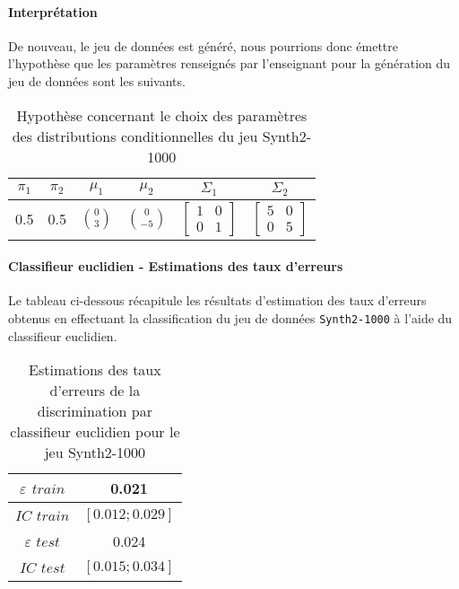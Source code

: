 \documentclass{report}
\begin{document}
\paragraph{Interprétation}
De nouveau, le jeu de données est généré, nous pourrions donc émettre l'hypothèse que les paramètres renseignés par l'enseignant pour la génération du jeu de données sont les suivants.

\begin{table}[h!]
    \centering
    \caption{Hypothèse concernant le choix des paramètres des distributions conditionnelles du jeu Synth2-1000}
    \label{tab:table1}
    \def\arraystretch{1.5}
    \begin{tabular}{c|c|c|c|c|c}
        $\pi_1$ & $\pi_2$ & $\mu_1$ & $\mu_2$ & $\Sigma_1$ & $\Sigma_2$\\
        \hline
        0.5 & 0.5 & $\binom{0}{3}$ & $\binom{0}{-5}$
        & $\begin{bmatrix} 1 & 0\\ 0 & 1 \end{bmatrix}$
        & $\begin{bmatrix} 5 & 0\\ 0 & 5 \end{bmatrix}$
        \\
    \end{tabular}
\end{table}

\newpage
\paragraph{Classifieur euclidien - Estimations des taux d'erreurs}
Le tableau ci-dessous récapitule les résultats d'estimation des taux d'erreurs obtenus en effectuant la classification du jeu de données \verb+Synth2-1000+ à l'aide du classifieur euclidien.

\begin{table}[h!]
    \centering
    \caption{Estimations des taux d'erreurs de la discrimination par classifieur euclidien pour le jeu Synth2-1000}
    \label{tab:table1}
    \def\arraystretch{1.5}
    \begin{tabular}{c|c}
        $\varepsilon$ $train$ & 0.021 \\
        \hline
        $IC$ $train$ & $[0.012 ; 0.029]$ \\
        \hline
        $\varepsilon$ $test$ & 0.024 \\
        \hline
        $IC$ $test$ & $[0.015 ; 0.034]$ \\
    \end{tabular}
\end{table}
\end{document}
